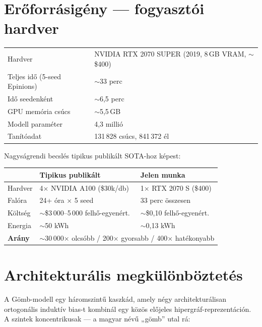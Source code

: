\documentclass[11pt,a4paper]{article}
\begin{document}
\section{Er\H{o}forr\'asig\'eny — fogyaszt\'oi hardver}

\begin{center}
\begin{tabular}{ll}
\toprule
Hardver & NVIDIA RTX 2070 SUPER (2019, 8\,GB VRAM, $\sim$\$400) \\
Teljes id\H{o} (5-seed Epinions) & $\sim$33 perc \\
Id\H{o} seedenk\'ent & $\sim$6,5 perc \\
GPU memória cs\'ucs & $\sim$5,5\,GB \\
Modell param\'eter & 4,3 milli\'o \\
Tan\'it\'oadat & 131\,828 cs\'ucs, 841\,372 \'el \\
\bottomrule
\end{tabular}
\end{center}

Nagys\'agrendi becsl\'es tipikus publik\'alt SOTA-hoz k\'epest:

\begin{center}
\begin{tabular}{lll}
\toprule
                & \textbf{Tipikus publik\'alt}              & \textbf{Jelen munka}          \\
\midrule
Hardver         & 4$\times$ NVIDIA A100 (\$30k/db)         & 1$\times$ RTX 2070 S (\$400) \\
Fal\'ora        & 24+ \'ora $\times$ 5 seed                 & 33 perc \"osszesen           \\
K\"olts\'eg     & $\sim$\$3\,000--5\,000 felh\H{o}-egyen\'ert. & $\sim$\$0,10 felh\H{o}-egyen\'ert. \\
Energia         & $\sim$50 kWh                              & $\sim$0,13 kWh               \\
\midrule
\textbf{Ar\'any} & \multicolumn{2}{l}{$\sim$30\,000$\times$ olcs\'obb / 200$\times$ gyorsabb / 400$\times$ hat\'ekonyabb} \\
\bottomrule
\end{tabular}
\end{center}

\section{Architektur\'alis megk\"ul\"onb\"oztet\'es}

A G\"omb-modell egy h\'aromszint\H{u} kaszk\'ad, amely n\'egy
architektur\'alisan ortogon\'alis indukt\'iv bias-t kombin\'al egy
k\"oz\"os el\H{o}jeles hipergr\'af-reprezent\'aci\'on. A szintek
koncentrikusak — a magyar n\'ev\H{u} „g\"omb” utal r\'a:
\end{document}
